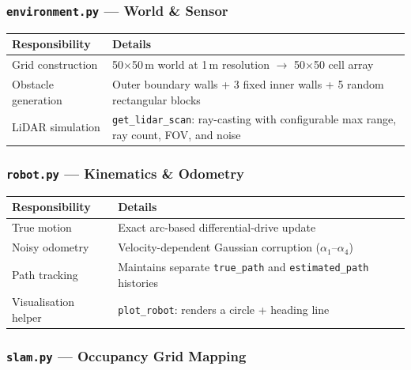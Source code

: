 \documentclass[12pt,a4paper]{article}
\begin{document}
\subsubsection{\texttt{environment.py} --- World \& Sensor}

\begin{table}[H]
\centering
\begin{tabular}{@{}p{3.5cm}p{10cm}@{}}
\toprule
\textbf{Responsibility} & \textbf{Details} \\
\midrule
Grid construction & 50$\times$50\,m world at 1\,m resolution $\to$ 50$\times$50 cell array \\
Obstacle generation & Outer boundary walls + 3 fixed inner walls + 5 random rectangular blocks \\
LiDAR simulation & \texttt{get\_lidar\_scan}: ray-casting with configurable max range, ray count, FOV, and noise \\
\bottomrule
\end{tabular}
\end{table}

\subsubsection{\texttt{robot.py} --- Kinematics \& Odometry}

\begin{table}[H]
\centering
\begin{tabular}{@{}p{3.5cm}p{10cm}@{}}
\toprule
\textbf{Responsibility} & \textbf{Details} \\
\midrule
True motion & Exact arc-based differential-drive update \\
Noisy odometry & Velocity-dependent Gaussian corruption (\(\alpha_1\)--\(\alpha_4\)) \\
Path tracking & Maintains separate \texttt{true\_path} and \texttt{estimated\_path} histories \\
Visualisation helper & \texttt{plot\_robot}: renders a circle + heading line \\
\bottomrule
\end{tabular}
\end{table}

\subsubsection{\texttt{slam.py} --- Occupancy Grid Mapping}
\end{document}

